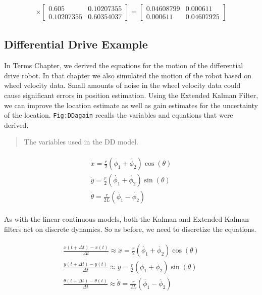 \begin{enumerate}
  \[\begin{aligned}
  \times \begin{bmatrix} 0.605   &    0.10207355 \\
   0.10207355  &  0.60354037 \end{bmatrix} =
  \begin{bmatrix} 0.04608799&  0.000611 \\
          0.000611  &  0.04607925 \end{bmatrix}
  \end{aligned}\]
\end{enumerate}

\hypertarget{differential-drive-example}{%
\subsection{Differential Drive
Example}\label{differential-drive-example}}

In Terms Chapter, we derived the equations for the motion of the
differential drive robot. In that chapter we also simulated the motion
of the robot based on wheel velocity data. Small amounts of noise in the
wheel velocity data could cause significant errors in position
estimation. Using the Extended Kalman Filter, we can improve the
location estimate as well as gain estimates for the uncertainty of the
location. \texttt{Fig:DDagain} recalls the variables and equations that
were derived.

\begin{quote}
The variables used in the DD model.
\end{quote}

\[\begin{aligned}
\begin{array}{l}
 \dot{x} = \frac{r}{2} (\dot{\phi_1}+\dot{\phi_2})\cos(\theta) \\[5mm]
\dot{y} = \frac{r}{2} (\dot{\phi_1}+\dot{\phi_2})\sin(\theta) \\[5mm]
\dot{\theta} = \frac{r}{2L} (\dot{\phi_1}-\dot{\phi_2})
\end{array}
\end{aligned}\]

As with the linear continuous models, both the Kalman and Extended
Kalman filters act on discrete dynamics. So as before, we need to
discretize the equations.

\[\begin{aligned}
\begin{array}{l}
\displaystyle \frac{x(t+\Delta t) - x(t)}{\Delta t}\approx \dot{x} = \frac{r}{2} (\dot{\phi_1}+\dot{\phi_2})\cos(\theta) \\[5mm]
\displaystyle \frac{y(t+\Delta t) - y(t)}{\Delta t}\approx \dot{y} = \frac{r}{2} (\dot{\phi_1}+\dot{\phi_2})\sin(\theta) \\[5mm]
\displaystyle \frac{\theta (t+\Delta t) - \theta (t)}{\Delta t}\approx \dot{\theta} = \frac{r}{2L} (\dot{\phi_1}-\dot{\phi_2})
\end{array}
\end{aligned}\]

